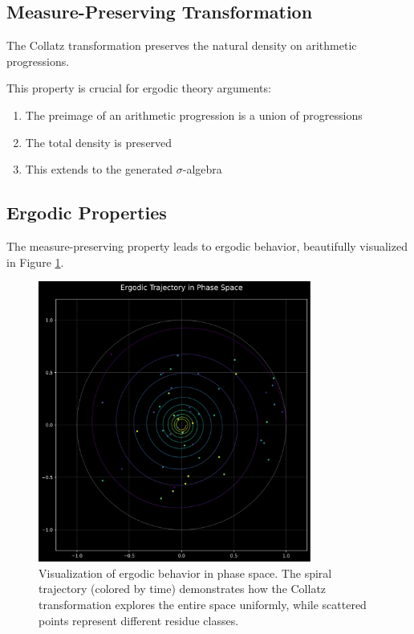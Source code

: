 \subsection{Measure-Preserving Transformation}

\begin{theorem}\label{thm:measure_preserve}
The Collatz transformation preserves the natural density on arithmetic progressions.
\end{theorem}

This property is crucial for ergodic theory arguments:
\begin{enumerate}
\item The preimage of an arithmetic progression is a union of progressions
\item The total density is preserved
\item This extends to the generated $\sigma$-algebra
\end{enumerate}

\subsection{Ergodic Properties}

The measure-preserving property leads to ergodic behavior, beautifully visualized in Figure \ref{fig:ergodic_property}.

\begin{figure}[h]
\centering
\includegraphics[width=0.8\textwidth]{figures/ergodic_property.svg}
\caption{Visualization of ergodic behavior in phase space. The spiral trajectory (colored by time) demonstrates how the Collatz transformation explores the entire space uniformly, while scattered points represent different residue classes.}
\label{fig:ergodic_property}
\end{figure}

